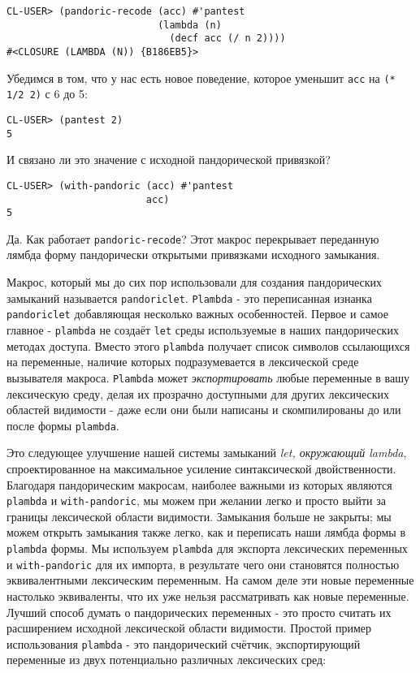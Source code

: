 \begin{verbatim}
CL-USER> (pandoric-recode (acc) #'pantest
                          (lambda (n)
                            (decf acc (/ n 2))))
#<CLOSURE (LAMBDA (N)) {B186EB5}>
\end{verbatim}

Убедимся в том, что у нас есть новое поведение, которое уменьшит \verb"acc" на \verb"(* 1/2 2)" с 6 до 5:

\begin{verbatim}
CL-USER> (pantest 2)
5
\end{verbatim}

И связано ли это значение с исходной пандорической привязкой?

\begin{verbatim}
CL-USER> (with-pandoric (acc) #'pantest
                        acc)
5
\end{verbatim}

Да. Как работает \verb"pandoric-recode"? Этот макрос перекрывает переданную лямбда форму пандорически открытыми привязками исходного замыкания.

Макрос, который мы до сих пор использовали для создания пандорических замыканий называется \verb"pandoriclet". \verb"Plambda" - это переписанная изнанка \verb"pandoriclet" добавляющая несколько важных особенностей. Первое и самое главное - \verb"plambda" не создаёт \verb"let" среды используемые в наших пандорических методах доступа. Вместо этого \verb"plambda" получает список символов ссылающихся на переменные, наличие которых подразумевается в лексической среде вызывателя макроса. \verb"Plambda" может \emph{экспортировать} любые переменные в вашу лексическую среду, делая их прозрачно доступными для других лексических областей видимости - даже если они были написаны и скомпилированы до или после формы \verb"plambda".

Это следующее улучшение нашей системы замыканий \emph{let, окружающий lambda}, спроектированное на максимальное усиление синтаксической двойственности. Благодаря пандорическим макросам, наиболее важными из которых являются \verb"plambda" и \verb"with-pandoric", мы можем при желании легко и просто выйти за границы лексической области видимости. Замыкания больше не закрыты; мы можем открыть замыкания также легко, как и переписать наши лямбда формы в \verb"plambda" формы. Мы используем \verb"plambda" для экспорта лексических переменных и \verb"with-pandoric" для их импорта, в результате чего они становятся полностью эквивалентными лексическим переменным. На самом деле эти новые переменные настолько эквиваленты, что их уже нельзя рассматривать как новые переменные. Лучший способ думать о пандорических переменных - это просто считать их расширением исходной лексической области видимости. Простой пример использования \verb"plambda" - это пандорический счётчик, экспортирующий переменные из двух потенциально различных лексических сред:

